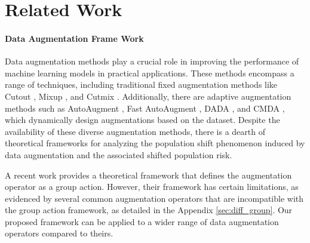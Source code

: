 \section{Related Work}
\paragraph{Data Augmentation Frame Work}
Data augmentation methods play a crucial role in improving the performance of machine learning models in practical applications. These methods encompass a range of techniques, including traditional fixed augmentation methods like Cutout \cite{07devries2017improved}, Mixup \cite{08zhang2017mixup}, and Cutmix  \cite{09yun2019cutmix}. Additionally, there are adaptive augmentation methods such as AutoAugment \cite{Cubuk_2019_CVPR}, Fast AutoAugment \cite{NEURIPS2019_6add07cf}, DADA \cite{li2020dada}, and CMDA \cite{tian2021continuous}, which dynamically design augmentations based on the dataset. Despite the availability of these diverse augmentation methods, there is a dearth of theoretical frameworks for analyzing the population shift phenomenon induced by data augmentation and the associated shifted population risk.

A recent work \cite{chen2020group} provides a theoretical framework that defines the augmentation operator as a group action. However, their framework has certain limitations, as evidenced by several common augmentation operators that are incompatible with the group action framework, as detailed in the Appendix \ref{sec:diff_group}. Our proposed framework can be applied to a wider range of data augmentation operators compared to theirs.

